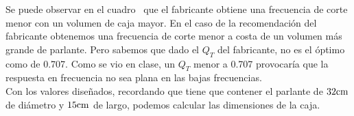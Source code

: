 \begin{table}[H]  %

    \setlength\arrayrulewidth{1.5pt}
    \def\clinecolor{\hhline{|>{\arrayrulecolor{white}}-%
    >{\arrayrulecolor{white}}|-|-|-|}}
	\caption{\footnotesize{Comparación de los valores diseñados (suspensión acústica) con los recomendados por el fabricante.}}
	\label{table:table_comparison_recomendations}
\end{table}


Se puede observar en el cuadro~ que el fabricante obtiene una frecuencia de corte menor con un volumen de caja mayor. En el caso de la recomendación del fabricante obtenemos una frecuencia de corte menor a costa de un volumen más grande de parlante. Pero sabemos que dado el $Q_{T}$ del fabricante, no es el óptimo como de \num{0.707}. Como se vio en clase, un $Q_{T}$ menor a \num{0.707} provocaría que la respuesta en frecuencia no sea plana en las bajas frecuencias.\\


Con los valores diseñados, recordando que tiene que contener el parlante de $32 \si[per-mode=symbol]{\centi\meter}$ de diámetro y $15 \si[per-mode=symbol]{\centi\meter}$ de largo, podemos calcular las dimensiones de la caja.

